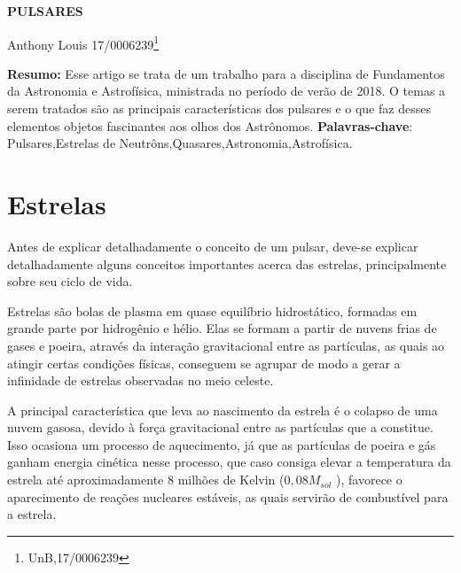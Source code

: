 \documentclass[article,12pt,oneside,a4paper,english,brazil,sumario=tradicional]{abntex2}
\begin{document}
\frenchspacing %

\begin{center}
	\uppercase{\bfseries{Pulsares}}
	\vspace{12pt}
\end{center}

\begin{flushright}
	Anthony Louis 17/0006239\footnote{UnB,17/0006239}
	\vspace{12pt}
\end{flushright}

\begin{footnotesize}
\SingleSpacing
\noindent
\small{\textbf{Resumo:}}
\noindent
\small
Esse artigo se trata de um trabalho para a disciplina de Fundamentos da Astronomia e Astrofísica, ministrada no período de verão de 2018. O temas a serem tratados são as principais características dos pulsares e o que faz desses elementos objetos fascinantes aos olhos dos Astrônomos.
\noindent
\textbf{Palavras-chave}: Pulsares,Estrelas de Neutrôns,Quasares,Astronomia,Astrofísica.
\end{footnotesize}

\textual
\pagestyle{simple}


\section{Estrelas}
\label{secIntroducao}
\normalsize
Antes de explicar detalhadamente o conceito de um pulsar, deve-se explicar detalhadamente alguns conceitos importantes acerca das estrelas, principalmente sobre seu ciclo de vida.

Estrelas são bolas de plasma em quase equilíbrio hidrostático, formadas em grande parte por hidrogênio e hélio. Elas se formam a partir de nuvens frias de gases e poeira, através da interação gravitacional entre as partículas, as quais ao atingir certas condições físicas, conseguem se agrupar de modo a gerar a infinidade de estrelas observadas no meio celeste.

A principal característica que leva ao nascimento da estrela é o colapso de uma nuvem gasosa, devido à força gravitacional entre as partículas que a constitue. Isso ocasiona um processo de aquecimento, já que as partículas de poeira e gás ganham energia cinética nesse processo, que caso consiga elevar a temperatura da estrela até aproximadamente 8 milhões de Kelvin ($0,08 M_{sol}$ ), favorece o aparecimento de reações nucleares estáveis, as quais servirão de combustível para a estrela.
\end{document}
